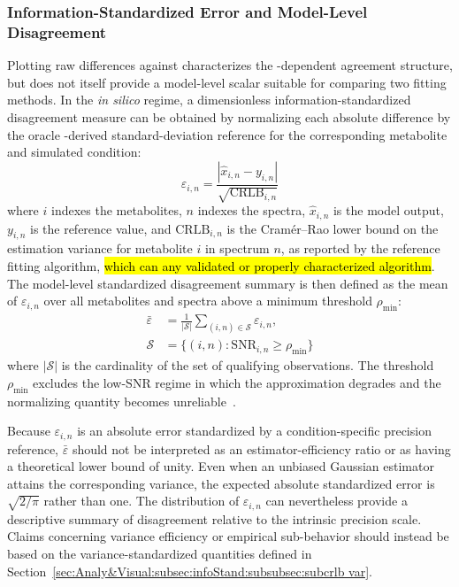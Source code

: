 \subsubsection{Information-Standardized Error and Model-Level Disagreement}
\label{subsubsec:efficiency_index}
Plotting raw differences against \SNR characterizes the \SNR-dependent agreement structure, but does not itself provide a model-level scalar suitable for comparing two fitting methods. In the \textit{in silico} regime, a dimensionless information-standardized disagreement measure can be obtained by normalizing each absolute difference by the oracle \CRLB-derived standard-deviation reference for the corresponding metabolite and simulated condition:
\begin{equation}\label{eqn:crlb_normalized_error}
    \varepsilon_{i,n} = \frac{|\hat{x}_{i,n} - y_{i,n}|}{\sqrt{\mathrm{CRLB}_{i,n}}}    
\end{equation}
\noindent where $i$ indexes the metabolites, $n$ indexes the spectra, $\hat{x}_{i,n}$ is the \DL model output, $y_{i,n}$ is the reference value, and $\mathrm{CRLB}_{i,n}$ is the Cram{\'e}r--Rao lower bound on the estimation variance for metabolite $i$ in spectrum $n$, as reported by the reference fitting algorithm, \hl{which can any validated or properly characterized algorithm}. The model-level standardized disagreement summary is then defined as the mean of $\varepsilon_{i,n}$ over all metabolites and spectra above a minimum \SNR threshold $\rho_{\min}$:
\begin{equation}\label{eqn:efficiency_index}
\begin{aligned}
    \bar{\varepsilon} &= \frac{1}{|\mathcal{S}|}
        \sum_{(i,n) \in \mathcal{S}} \varepsilon_{i,n}, \\
    \mathcal{S} &= \{(i,n) : \mathrm{SNR}_{i,n} \geq \rho_{\min}\}    
\end{aligned}
\end{equation}
\noindent where $|\mathcal{S}|$ is the cardinality of the set of qualifying observations. The threshold $\rho_{\min}$ excludes the low-SNR regime in which the \CRLB approximation degrades and the normalizing quantity becomes unreliable~\cite{Cavassila2001}. 

Because $\varepsilon_{i,n}$ is an absolute error standardized by a condition-specific precision reference, $\bar{\varepsilon}$ should not be interpreted as an estimator-efficiency ratio or as having a theoretical lower bound of unity. Even when an unbiased Gaussian estimator attains the corresponding \CRLB variance, the expected absolute standardized error is $\sqrt{2/\pi}$ rather than one. The distribution of $\varepsilon_{i,n}$ can nevertheless provide a descriptive summary of disagreement relative to the intrinsic precision scale. Claims concerning variance efficiency or empirical sub-\CRLB behavior should instead be based on the variance-standardized quantities defined in Section~\ref{sec:Analy&Visual:subsec:infoStand:subsubsec:subcrlb var}.

